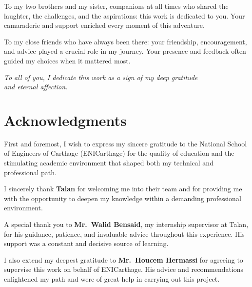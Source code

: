 \documentclass[12pt,a4paper]{report}
\begin{document}
To my two brothers and my sister, companions at all times who shared the laughter,
the challenges, and the aspirations: this work is dedicated to you.
Your camaraderie and support enriched every moment of this adventure.

\vspace{1cm}

To my close friends who have always been there: your friendship, encouragement,
and advice played a crucial role in my journey. Your presence and feedback often
guided my choices when it mattered most.

\vspace{1.4cm}

\begin{flushright}
\itshape
To all of you, I dedicate this work as a sign of my deep gratitude\\
and eternal affection.
\end{flushright}

\newpage
\thispagestyle{fancy}
\section*{Acknowledgments}

\vspace{1cm}

First and foremost, I wish to express my sincere gratitude to the National School
of Engineers of Carthage (ENICarthage) for the quality of education and the
stimulating academic environment that shaped both my technical and professional path.

\vspace{0.9cm}

I sincerely thank \textbf{Talan} for welcoming me into their team and for providing
me with the opportunity to deepen my knowledge within a demanding professional
environment.

\vspace{0.9cm}

A special thank you to \textbf{Mr.\ Walid Bensaid}, my internship supervisor at Talan,
for his guidance, patience, and invaluable advice throughout this experience.
His support was a constant and decisive source of learning.

\vspace{0.9cm}

I also extend my deepest gratitude to \textbf{Mr.\ Houcem Hermassi} for agreeing
to supervise this work on behalf of ENICarthage. His advice and recommendations
enlightened my path and were of great help in carrying out this project.
\end{document}
